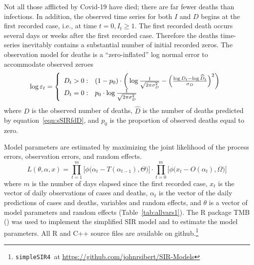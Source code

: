 \documentclass[12pt,letterpaper]{article}
\newcommand\SSm{{\tt simpleSIR4}}
\begin{document}
Not all those afflicted by Covid-19 have died; there are far fewer
deaths than infections. In addition,
the observed time series for both $I$ and $D$ begins at the first recorded
case, i.e., at time $t=0, I_t \ge 1$. The first recorded death occurs
several days or weeks after the first recorded case.
Therefore the deaths time-series inevitably contains a
substantial number of initial recorded zeros. 
The observation model for deaths is a ``zero-inflated'' log normal
error to accommodate observed zeroes
\begin{equation}
\label{eqn:ZIlogNlike}
  \log \varepsilon_t = \left\{
    \begin{array}{r@{\;:\quad}l}
       D_t > 0 &
(1-p_0)\cdot\bigg(\log\frac{1}{\sqrt{2\pi\sigma^2_D}}
          -\Bigl(\frac{\log D_t-\log\widehat{D}_t}{\sigma_D}\Bigr)^2\bigg)\\
       D_t = 0 & p_0 \cdot\log \frac{1}{\sqrt{2\pi\sigma^2_D}}\\
    \end{array}
  \right.
\end{equation}
where $D$ is the observed number of deaths,
$\widehat{D}$ is the number of deaths predicted by
equation~\ref{eqn:sSIRfdD}, 
and $p_0$ is the proportion of observed deaths equal to zero.

Model parameters are estimated by
maximizing the joint likelihood of the process errors, observation
errors, and random effects.
\begin{equation}
\label{eqn:likelihood}
L(\theta,\alpha,x)=
\prod^m_{t=1}\big[\phi\big(\alpha_t-T(\alpha_{t-1}), \Theta\big)\big]\cdot
\prod^m_{t=0}\big[\phi\big(x_t-O(\alpha_t), \Omega\big)\big]
\end{equation}
where $m$ is the number of days elapsed since the first recorded case,
$x_t$ is the vector of daily observations of cases and deaths,
$\alpha_t$ is the vector of the daily predictions of cases and deaths,
variables and random effects,
and $\theta$ 
is a vector of model parameters and random effects (Table~\ref{tab:allvars1}).
The R package TMB (\cite{TMB0000}) was used to implement the
simplified SIR model and to 
estimate the model parameters.
All R and C++ source files are available on 
github.\footnote{\SSm~at \url{https://github.com/johnrsibert/SIR-Models}}
\end{document}
